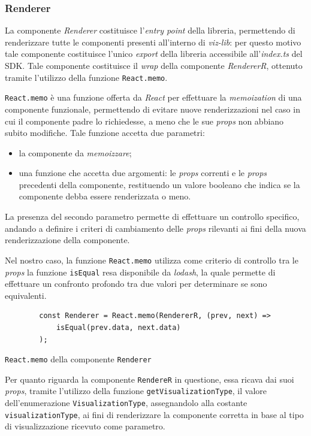 \subsubsection{Renderer}
La componente \textit{Renderer} costituisce l'\textit{entry point} della libreria, permettendo di renderizzare tutte le componenti presenti all'interno di
\textit{viz-lib}: per questo motivo tale componente costituisce l'unico \textit{export} della libreria accessibile all'\textit{index.ts} del SDK. \newline
Tale componente costituisce il \textit{wrap} della componente \textit{RendererR}, ottenuto tramite l'utilizzo della funzione \texttt{React.memo}.
\begin{adjustwidth}{4em}{0pt}
    \texttt{React.memo} è una funzione offerta da \textit{React} per effettuare la \textit{memoization} di una componente funzionale, permettendo di evitare
    nuove renderizzazioni nel caso in cui il componente padre lo richiedesse, a meno che le sue \textit{props} non abbiano subito modifiche. \newline
    Tale funzione accetta due parametri:
    \begin{itemize}
        \item la componente da \textit{memoizzare};
        \item una funzione che accetta due argomenti: le \textit{props} correnti e le \textit{props} precedenti della componente, restituendo un valore booleano che indica
              se la componente debba essere renderizzata o meno.
    \end{itemize}
    La presenza del secondo parametro permette di effettuare un controllo specifico, andando a definire i criteri di cambiamento delle \textit{props}
    rilevanti ai fini della nuova renderizzazione della componente. \newline
\end{adjustwidth}
Nel nostro caso, la funzione \texttt{React.memo} utilizza come criterio di controllo tra le \textit{props} la funzione \texttt{isEqual} resa disponibile da \textit{lodash},
la quale permette di effettuare un confronto profondo tra due valori per determinare se sono equivalenti. \newline
\begin{listing}[H]
    \begin{verbatim}
        const Renderer = React.memo(RendererR, (prev, next) =>
            isEqual(prev.data, next.data)
        );
  \end{verbatim}
    \caption{\texttt{React.memo} della componente \texttt{Renderer}}
    \label{listing:react_memo}
\end{listing}
Per quanto riguarda la componente \texttt{RendereR} in questione, essa ricava dai suoi \textit{props}, tramite l'utilizzo della funzione \texttt{getVisualizationType}, il valore
dell'enumerazione \texttt{VisualizationType}, assegnandolo alla costante \texttt{visualizationType}, ai fini di renderizzare la componente corretta in base al tipo di
visualizzazione ricevuto come parametro.

